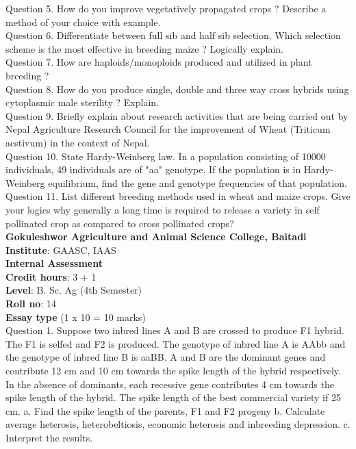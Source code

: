 \documentclass[12pt]{article}\usepackage[]{graphicx}\usepackage[]{color}
\begin{document}
Question 5. How do you improve vegetatively propagated crops ? Describe a method of your choice with example.\\
Question 6. Differentiate between full sib and half sib selection. Which selection scheme is the most effective in breeding maize ? Logically explain.\\
Question 7. How are haploids/monoploids produced and utilized in plant breeding ?\\
Question 8. How do you produce single, double and three way cross hybrids using cytoplasmic male sterility ? Explain.\\
Question 9. Briefly explain about research activities that are being carried out by Nepal Agriculture Research Council for the improvement of Wheat (Triticum aestivum) in the context of Nepal.\\
Question 10. State Hardy-Weinberg law. In a population consisting of 10000 individuals, 49 individuals are of "aa" genotype. If the population is in Hardy-Weinberg equilibrium, find the gene and genotype frequencies of that population.\\
Question 11. List different breeding methods used in wheat and maize crops. Give your logics why generally a long time is required to release a variety in self pollinated crop as compared to cross pollinated crops?\\
\clearpage 
{\centering \Large{\textbf{Gokuleshwor Agriculture and Animal Science College, Baitadi}} \\[0.25cm]
            \textbf{Institute}: GAASC, IAAS \\[0.2cm]
            \textbf{Internal Assessment} \\[0.2cm]} 
\textbf{Credit hours}: 3 + 1 \\ 
\textbf{Level}: B. Sc. Ag (4th Semester) \\
\textbf{Roll no}: 14 \\[0.5cm] 
\textbf{Essay type} (1 x 10 = 10 marks) \\
Question 1. Suppose two inbred lines A and B are crossed to produce F1 hybrid. The F1 is selfed and F2 is produced. The genotype of inbred line A is AAbb and the genotype of inbred line B is aaBB. A and B are the dominant genes and contribute 12 cm and 10 cm towards the spike length of the hybrid respectively. In the absence of dominants, each recessive gene contributes 4 cm towards the spike length of the hybrid. The spike length of the best commercial variety if 25 cm. a. Find the spike length of the parents, F1 and F2 progeny b. Calculate average heterosis, heterobeltiosis, economic heterosis and inbreeding depression. c. Interpret the results.\\
\end{document}
